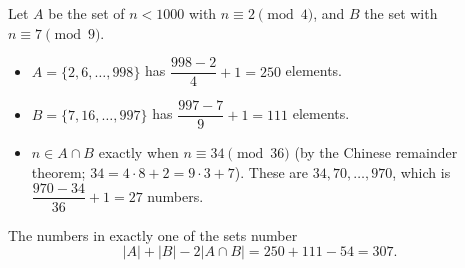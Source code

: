 Let $A$ be the set of $n<1000$ with $n\equiv2\pmod4$, and $B$ the set with $n\equiv7\pmod9$.
\begin{itemize}
\item $A=\{2,6,\dots,998\}$ has $\dfrac{998-2}{4}+1=250$ elements.
\item $B=\{7,16,\dots,997\}$ has $\dfrac{997-7}{9}+1=111$ elements.
\item $n\in A\cap B$ exactly when $n\equiv34\pmod{36}$ (by the Chinese remainder theorem; $34=4\cdot8+2=9\cdot3+7$). These are $34,70,\dots,970$, which is $\dfrac{970-34}{36}+1=27$ numbers.
\end{itemize}
The numbers in exactly one of the sets number
\[|A|+|B|-2|A\cap B|=250+111-54=\boxed{307}.\]
